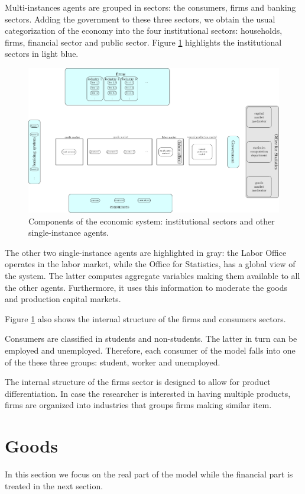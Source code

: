 \documentclass{book}
\begin{document}
Multi-instances agents are grouped in sectors: the consumers, firms and banking sectors. Adding the government to these three sectors, we obtain the usual categorization of the economy into the four institutional sectors: households, firms, financial sector and public sector. Figure \ref{fig:componentsc1} highlights the institutional sectors in light blue.
\begin{figure}[htp]
\hskip-1cm\includegraphics[scale=0.5]{agents_and_interactions_figure1c1-0.pdf}
	\caption{Components of the economic system: institutional sectors and other single-instance agents.}
	\label{fig:componentsc1}
\end{figure}
The other two single-instance agents are highlighted in gray: the Labor Office operates in the labor market, while the Office for Statistics, has a global view of the system. The latter computes aggregate variables making them available to all the other agents. Furthermore, it uses this information to moderate the goods and production capital markets.

Figure \ref{fig:componentsc1} also shows the internal structure of the firms and consumers sectors. 

Consumers are classified in students and non-students. The latter in turn can be employed and unemployed. Therefore, each consumer of the model falls into one of the these three groups: student, worker and unemployed.

The internal structure of the firms sector is designed to allow for product differentiation. In case the researcher is interested in having multiple products, firms are organized into industries that groups firms making similar item.


\clearpage
\section{Goods}
In this section we focus on the real part of the model while the financial part is treated in the next section.
\end{document}

